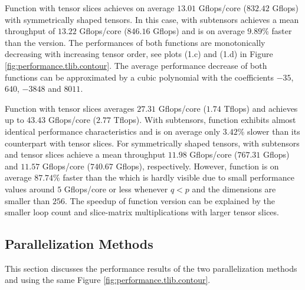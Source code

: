 Function  with tensor slices achieves on average $13.01$ Gflops/core ($832.42$ Gflops) with symmetrically shaped tensors.
In this case,  with subtensors achieves a mean throughput of $13.22$ Gflops/core ($846.16$ Gflops) and is on average $9.89$\% faster than the  version.
The performances of both functions are monotonically decreasing with increasing tensor order, see plots (1.c) and (1.d) in Figure \ref{fig:performance.tlib.contour}.
The average performance decrease of both functions can be approximated by a cubic polynomial with the coefficients $-35$, $640$, $-3848$ and $8011$.

Function  with tensor slices averages $27.31$ Gflops/core ($1.74$ Tflops) and achieves up to $43.43$ Gflops/core ($2.77$ Tflops).
With subtensors, function  exhibits almost identical performance characteristics and is on average only $3.42$\% slower than its counterpart with tensor slices.
For symmetrically shaped tensors,  with subtensors and tensor slices achieve a mean throughput $11.98$ Gflops/core ($767.31$ Gflops) and $11.57$ Gflops/core ($740.67$ Gflops), respectively.
However, function  is on average $87.74$\% faster than the  which is hardly visible due to small performance values around $5$ Gflops/core or less whenever $q<p$ and the dimensions are smaller than $256$.
The speedup of function  version can be explained by the smaller loop count and slice-matrix multiplications with larger tensor slices.


\subsection{Parallelization Methods}
This section discusses the performance results of the two parallelization methods  and  using the same Figure \ref{fig:performance.tlib.contour}.

